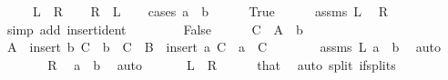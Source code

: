 \begin{isabellebody}
\ \ \ \ {\isacharparenleft}{\kern0pt}\ {\isachardoublequoteopen}{\isacharquery}{\kern0pt}L\ {\isasymlongleftrightarrow}\ {\isacharquery}{\kern0pt}R{\isachardoublequoteclose}{\isacharparenright}{\kern0pt}\isanewline
%
\isadelimproof
%
\endisadelimproof
%
\isatagproof
{}\isamarkupfalse%
\isanewline
\ \ \isamarkupfalse%
\ {\isacharquery}{\kern0pt}R\ \ {\isacharquery}{\kern0pt}L\isanewline
\ \ \isamarkupfalse%
\ {\isacharparenleft}{\kern0pt}cases\ {\isachardoublequoteopen}a\ {\isacharequal}{\kern0pt}\ b{\isachardoublequoteclose}{\isacharparenright}{\kern0pt}\isanewline
\ \ \ \ \isamarkupfalse%
\ True\isanewline
\ \ \ \ \isamarkupfalse%
\ assms\ {\isacartoucheopen}{\isacharquery}{\kern0pt}L{\isacartoucheclose}\ \isamarkupfalse%
\ {\isacharquery}{\kern0pt}R\isanewline
\ \ \ \ \ \ \isamarkupfalse%
\ {\isacharparenleft}{\kern0pt}simp\ add{\isacharcolon}{\kern0pt}\ insert{\isacharunderscore}{\kern0pt}ident{\isacharparenright}{\kern0pt}\isanewline
\ \ \isamarkupfalse%
\isanewline
\ \ \ \ \isamarkupfalse%
\ False\isanewline
\ \ \ \ \isamarkupfalse%
\ {\isacharquery}{\kern0pt}C\ {\isacharequal}{\kern0pt}\ {\isachardoublequoteopen}A\ {\isacharminus}{\kern0pt}\ {\isacharbraceleft}{\kern0pt}b{\isacharbraceright}{\kern0pt}{\isachardoublequoteclose}\isanewline
\ \ \ \ \isamarkupfalse%
\ {\isachardoublequoteopen}A\ {\isacharequal}{\kern0pt}\ insert\ b\ {\isacharquery}{\kern0pt}C\ {\isasymand}\ b\ {\isasymnotin}\ {\isacharquery}{\kern0pt}C\ {\isasymand}\ B\ {\isacharequal}{\kern0pt}\ insert\ a\ {\isacharquery}{\kern0pt}C\ {\isasymand}\ a\ {\isasymnotin}\ {\isacharquery}{\kern0pt}C{\isachardoublequoteclose}\isanewline
\ \ \ \ \ \ \isamarkupfalse%
\ assms\ {\isacartoucheopen}{\isacharquery}{\kern0pt}L{\isacartoucheclose}\ {\isacartoucheopen}a\ {\isasymnoteq}\ b{\isacartoucheclose}\ \isamarkupfalse%
\ auto\isanewline
\ \ \ \ \isamarkupfalse%
\ \isamarkupfalse%
\ {\isacharquery}{\kern0pt}R\ \isamarkupfalse%
\ {\isacartoucheopen}a\ {\isasymnoteq}\ b{\isacartoucheclose}\ \isamarkupfalse%
\ auto\isanewline
\ \ \isamarkupfalse%
\isanewline
\ \ \isamarkupfalse%
\ {\isacharquery}{\kern0pt}L\ \ {\isacharquery}{\kern0pt}R\isanewline
\ \ \ \ \isamarkupfalse%
\ that\ \isamarkupfalse%
\ {\isacharparenleft}{\kern0pt}auto\ split{\isacharcolon}{\kern0pt}\ if{\isacharunderscore}{\kern0pt}splits{\isacharparenright}{\kern0pt}\isanewline

\end{isabellebody}
